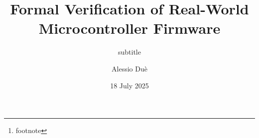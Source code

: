 



\listfiles





\titlehead{
  {\Large Università di Pisa \hfill A.Y.~2024--2025} \\
  {\large Dipartimento di Informatica}
}
\subject{Master's Thesis in Computer Science}
\title{Formal Verification of Real-World Microcontroller Firmware}
\subtitle{subtitle }
\author{Alessio Duè}
\date{18 July 2025}
\publishers{relatori...\thanks{footnote}}


\maketitle %
\tableofcontents

\mainmatter





\backmatter
\printbibliography[heading=bibintoc]


